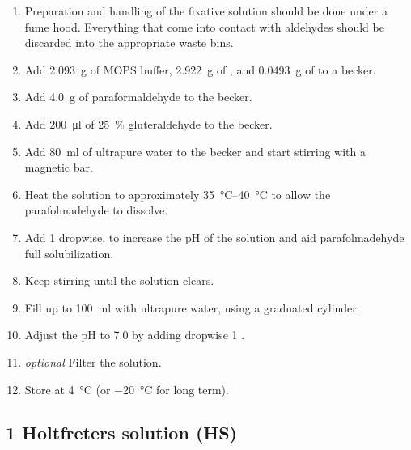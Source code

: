 \documentclass[10pt]{report}
\begin{document}
\begin{enumerate}
	\item Preparation and handling of the fixative solution should be done under a fume hood. Everything that come into contact with aldehydes should be discarded into the appropriate waste bins.
	\item Add \qty{2.093}{\g} of MOPS buffer, \qty{2.922}{\g} of , and \qty{0.0493}{\g} of  to a becker.
	\item Add \qty{4.0}{\g} of paraformaldehyde to the becker.
	\item Add \qty{200}{\ul} of \qty{25}{\percent} gluteraldehyde to the becker.
	\item Add \qty{80}{\ml} of ultrapure water to the becker and start stirring with a magnetic bar.
	\item Heat the solution to approximately \qtyrange{35}{40}{\degreeCelsius} to allow the parafolmadehyde to dissolve.
	\item Add \qty{1}{\molar}  dropwise, to increase the pH of the solution and aid parafolmadehyde full solubilization.
	\item Keep stirring until the solution clears.
	\item Fill up to \qty{100}{\ml} with ultrapure water, using a graduated cylinder.
	\item Adjust the pH to 7.0 by adding dropwise \qty{1}{\molar} .
	\item \textit{optional} Filter the solution.
	\item Store at \qty{4}{\degreeCelsius} (or \qty{-20}{\degreeCelsius} for long term).
\end{enumerate}

\subsection*{1\per{} Holtfreter\curlyapostrophe s solution (HS)}
\end{document}
